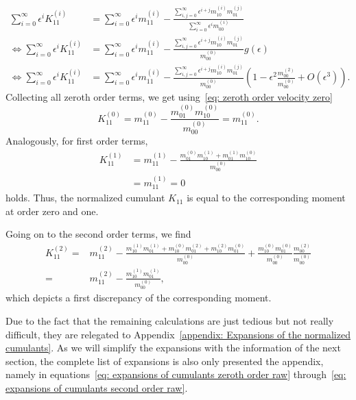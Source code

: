 \begin{equation*}
  \begin{aligned}
    \sum_{i=0}^\infty \epsilon^i K_{11}^{(i)}
    & = \sum_{i=0}^\infty \epsilon^i m_{11}^{(i)} -
    \frac{\sum_{i,j=0}^\infty \epsilon^{i+j} m_{10}^{(i)}m_{01}^{(j)}}
        {\sum_{i=0}^\infty \epsilon^i m_{00}^{(i)}} \\
    \Leftrightarrow
    \sum_{i=0}^\infty \epsilon^i K_{11}^{(i)}
    & = \sum_{i=0}^\infty \epsilon^i m_{11}^{(i)} -
    \frac{\sum_{i,j=0}^\infty \epsilon^{i+j} m_{10}^{(i)}m_{01}^{(j)}}
    {m_{00}^{(0)}}
    g(\epsilon)\\
    \Leftrightarrow
  \sum_{i=0}^\infty \epsilon^i K_{11}^{(i)}
   & = \sum_{i=0}^\infty \epsilon^i m_{11}^{(i)} -
  \frac{\sum_{i,j=0}^\infty \epsilon^{i+j} m_{10}^{(i)}m_{01}^{(j)}}
      {m_{00}^{(0)}}
  \left(1 - \epsilon^2 \frac{m_{00}^{(2)}}{m_{00}^{(0)}}  + O(\epsilon^3)\right).
\end{aligned}
\end{equation*}
Collecting all zeroth order terms, we get using~\eqref{eq: zeroth order velocity zero}
\begin{equation*}
  K_{11}^{(0)} = m_{11}^{(0)} - \frac{m_{01}^{(0)}m_{10}^{(0)}}{m_{00}^{(0)}} =  m_{11}^{(0)}.
\end{equation*}
Analogously, for first order terms,
\begin{equation*}
  \begin{aligned}
    K_{11}^{(1)} & = m_{11}^{(1)} - \frac{m_{01}^{(0)}m_{10}^{(1)}+m_{01}^{(1)}m_{10}^{(0)}}{m_{00}^{(0)}}
    \\
    &= m_{11}^{(1)} = 0
  \end{aligned}
\end{equation*}
holds.
Thus, the normalized cumulant $K_{11}$ is equal to the corresponding moment at order zero and one.

Going on to the second order terms, we find
\begin{equation}
  \begin{aligned}
    K_{11}^{(2)}
    = &m_{11}^{(2)}
    - \frac{
      m_{10}^{(1)}m_{01}^{(1)}
    + m_{10}^{(0)}m_{01}^{(2)}
    + m_{10}^{(2)}m_{01}^{(0)}
    }{m_{00}^{(0)}}
    + \frac{m_{10}^{(0)}m_{01}^{(0)}}{m_{00}^{(0)}}
    \frac{m_{00}^{(2)}}{{m_{00}^{(0)}}}
    \\ = &
    m_{11}^{(2)}
    - \frac{ m_{10}^{(1)}m_{01}^{(1)}}{m_{00}^{(0)}},
  \end{aligned}
\end{equation}
which depicts a first discrepancy of the corresponding moment.

Due to the fact that the remaining calculations are just tedious but not really difficult, they are relegated to Appendix~\ref{appendix: Expansions of the normalized cumulants}.
As we will simplify the expansions with the information of the next section, the complete list of expansions is also only presented the appendix, namely in equations~\eqref{eq: expansions of cumulants zeroth order raw} through~\eqref{eq: expansions of cumulants second order raw}.
